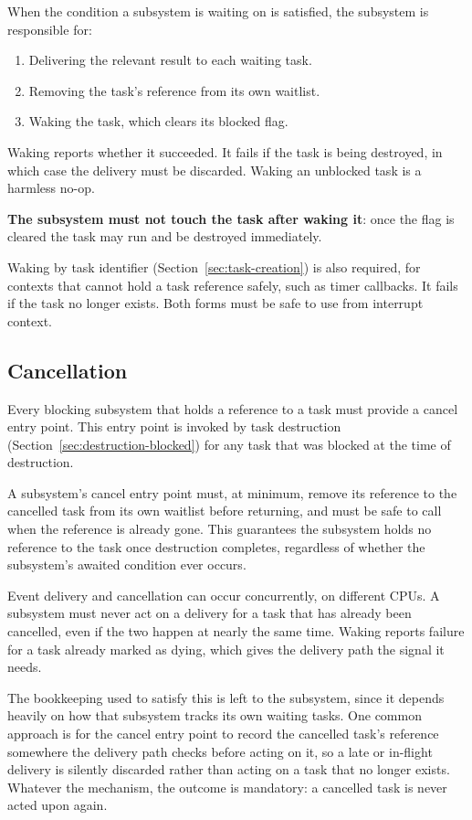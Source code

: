 \documentclass[11pt]{article}
\begin{document}
When the condition a subsystem is waiting on is satisfied, the subsystem is responsible for:

\begin{enumerate}
	\item Delivering the relevant result to each waiting task.
	\item Removing the task's reference from its own waitlist.
	\item Waking the task, which clears its blocked flag.
\end{enumerate}

Waking reports whether it succeeded. It fails if the task is being destroyed, in which case the delivery must be discarded.
Waking an unblocked task is a harmless no-op.

\textbf{The subsystem must not touch the task after waking it}: once the flag is cleared the task may run and be destroyed immediately.

Waking by task identifier (Section~\ref{sec:task-creation}) is also required, for contexts that cannot hold a task reference safely, such as timer callbacks. It fails if the task no longer exists. Both forms must be safe to use from interrupt context.

\subsection{Cancellation}
\label{sec:blocking-cancel}

Every blocking subsystem that holds a reference to a task must provide a cancel entry point.
This entry point is invoked by task destruction (Section~\ref{sec:destruction-blocked}) for any task that was blocked at the time of destruction.

A subsystem's cancel entry point must, at minimum, remove its reference to the cancelled task from its own waitlist before returning, and must be safe to call when the reference is already gone.
This guarantees the subsystem holds no reference to the task once destruction completes, regardless of whether the subsystem's awaited condition ever occurs.

Event delivery and cancellation can occur concurrently, on different CPUs.
A subsystem must never act on a delivery for a task that has already been cancelled, even if the two happen at nearly the same time.
Waking reports failure for a task already marked as dying, which gives the delivery path the signal it needs.

\begin{specnote}
	The bookkeeping used to satisfy this is left to the subsystem, since it depends heavily on how that subsystem tracks its own waiting tasks.
	One common approach is for the cancel entry point to record the cancelled task's reference somewhere the delivery path checks before acting on it, so a late or in-flight delivery is silently discarded rather than acting on a task that no longer exists.
	Whatever the mechanism, the outcome is mandatory: a cancelled task is never acted upon again.
\end{specnote}
\end{document}
